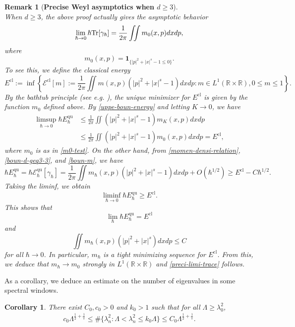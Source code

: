 \documentclass[%
11pt,  reqno]{amsart}
\newtheorem{corollary}[theorem]{Corollary}
\theoremstyle{remarkstyle}
\newtheorem{remark}{Remark}[section]
\newcommand{\1}{\hspace{0.2mm}\text{I}\hspace{0.2mm}}
\newcommand{\R}{\mathbb{R}}
\newcommand{\ld}{\lambda}
\newcommand{\Ld}{\Lambda}
\newcommand{\ind}{\mathbf 1}
\DeclareMathOperator*{\qua}{qu}
\DeclareMathOperator*{\cl}{cl}
\numberwithin{equation}{section}
\numberwithin{theorem}{section}
\begin{document}
	
	\begin{remark}[\bf Precise Weyl asymptotics when $d\geq 3$] \label{rem-rad-d-geq3} \mbox{} \\
		When $d\geq 3$, the above proof actually gives the asymptotic behavior
		\begin{align} \label{preci-limi-trace}
			\lim_{\hbar \to 0} \hbar {\rm Tr}[\gamma_\hbar] = \frac{1}{2\pi} \iint m_0(x,p) dxdp,
		\end{align}
		where 
		\[
		m_0(x,p) = \ind_{\{|p|^2+|x|^s-1\leq 0\}}.
		\]
		To see this, we define the classical energy
		$$
		E^{\cl} := \inf \left\{\mathcal E^{\cl}[m]:=\frac{1}{2\pi}\iint m(x,p)(|p|^2+|x|^s-1) dxdp : m \in L^1(\R\times \R), 0\leq m\leq 1\right\}.
		$$
		By the bathtub principle (see e.g. \cite[Theorem 1.14]{LL01}), the unique minimizer for $E^{\cl}$ is given by the function $m_0$ defined above. By \eqref{uppe-boun-energy} and letting $K \to 0$, we have
		\begin{align*}
			\limsup_{\hbar \to 0} \hbar E^{\qua}_{\hbar} &\leq \frac{1}{2\pi} \iint (|p|^2 + |x|^s -1) m_K(x,p) dxdp \\
			&\leq \frac{1}{2\pi} \iint (|p|^2 + |x|^s -1) m_0(x,p) dxdp = E^{\cl},
		\end{align*}
		where $m_0$ is as in \eqref{m0-test}. On the other hand, from \eqref{momen-densi-relation}, \eqref{boun-d-geq3-3}, and \eqref{boun-m}, we have
		\[
		\hbar E^{\qua}_{\hbar} =\hbar \mathcal E^{\qua}_{\hbar}[\gamma_\hbar] =\frac{1}{2\pi} \iint m_\hbar(x,p)(|p|^2+|x|^s-1) dxdp + O(\hbar^{1/2}) \geq E^{\cl} - C\hbar^{1/2}.
		\]
		Taking the liminf, we obtain
		$$
		\liminf_{\hbar \to 0} \hbar E^{\qua}_\hbar \geq E^{\cl}.
		$$
		This shows that
		$$
		\lim_{\hbar} \hbar E^{\qua}_\hbar = E^{\cl}
		$$
		and
		$$
		\iint m_\hbar(x,p)(|p|^2+|x|^s) dxdp \leq C
		$$
		for all $\hbar \to 0$. In particular, $m_\hbar$ is a tight minimizing sequence for $E^{\cl}$. From this, we deduce that $m_\hbar \to m_0$ strongly in $L^1(\R \times \R)$ and \eqref{preci-limi-trace} follows.		
	\end{remark}
	
	As a corollary, we deduce an estimate on the number of eigenvalues in some spectral windows.
	
	
	\begin{corollary} 
		\label{LEM:CLR}
		There exist $C_0, c_0>0$ and $k_0>1$ such that for all $\Ld \ge \ld_0^2$,
		\begin{align}
			\label{CLR2}
			c_0 \Ld^{\frac12 +\frac1s} \le \# \{ \ld_n^2 : \Ld < \ld_n^2 \leq k_0 \Ld\} \le C_0 \Ld^{\frac12 +\frac1s}.
		\end{align}
	\end{corollary}
	
\end{document}
